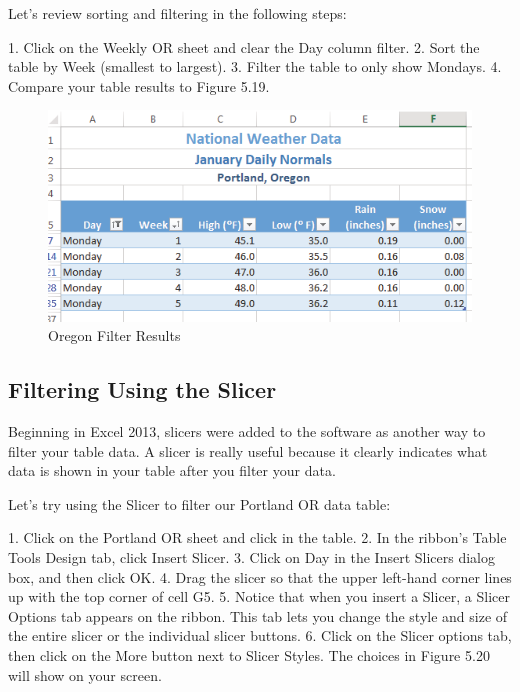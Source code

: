 Let’s review sorting and filtering in the following steps:

1.   Click on the Weekly OR sheet and clear the Day column filter.
2.   Sort the table by Week (smallest to largest).
3.   Filter the table to only show Mondays.
4.   Compare your table results to Figure 5.19.

\begin{figure}[H]
	\centering
	\includegraphics[width=\maxwidth{.95\linewidth}]{gfx/ch05_fig19}
	\caption{Oregon Filter Results}
	\label{05:fig19}
\end{figure}



\subsection{Filtering Using the Slicer}

Beginning in Excel 2013, slicers were added to the software as another way to filter your table data. A
slicer is really useful because it clearly indicates what data is shown in your table after you filter your
data.

Let’s try using the Slicer to filter our Portland OR data table:

1. Click on the Portland OR sheet and click in the table.
2. In the ribbon’s Table Tools Design tab, click Insert Slicer.
3. Click on Day in the Insert Slicers dialog box, and then click OK.
4. Drag the slicer so that the upper left-hand corner lines up with the top corner of cell G5.
5. Notice that when you insert a Slicer, a Slicer Options tab appears on the ribbon. This tab lets
you change the style and size of the entire slicer or the individual slicer buttons.
6. Click on the Slicer options tab, then click on the More button next to Slicer Styles. The choices
in Figure 5.20 will show on your screen.

